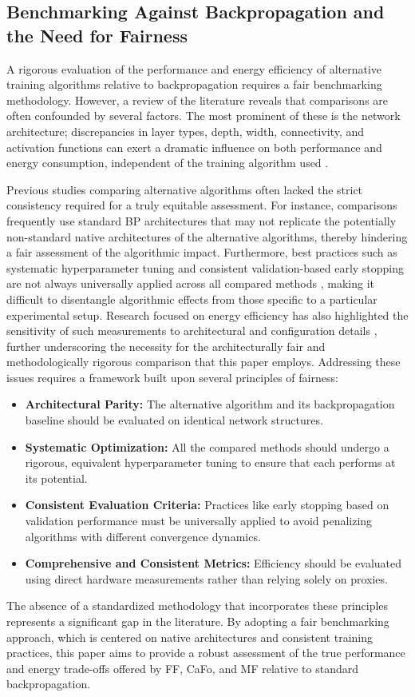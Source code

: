 \subsection{Benchmarking Against Backpropagation and the Need for Fairness}
\label{sec:fair_benchmarking_chap2}
A rigorous evaluation of the performance and energy efficiency of alternative training algorithms relative to backpropagation requires a fair benchmarking methodology. However, a review of the literature reveals that comparisons are often confounded by several factors. The most prominent of these is the network architecture; discrepancies in layer types, depth, width, connectivity, and activation functions can exert a dramatic influence on both performance and energy consumption, independent of the training algorithm used \cite{desislavov2024energy, yarally2023uncovering}.

Previous studies comparing alternative algorithms often lacked the strict consistency required for a truly equitable assessment. For instance, comparisons frequently use standard BP architectures that may not replicate the potentially non-standard native architectures of the alternative algorithms, thereby hindering a fair assessment of the algorithmic impact. Furthermore, best practices such as systematic hyperparameter tuning and consistent validation-based early stopping are not always universally applied across all compared methods \cite{hinton2022forward}, making it difficult to disentangle algorithmic effects from those specific to a particular experimental setup. Research focused on energy efficiency has also highlighted the sensitivity of such measurements to architectural and configuration details \cite{garcia2019estimation}, further underscoring the necessity for the architecturally fair and methodologically rigorous comparison that this paper employs.
Addressing these issues requires a framework built upon several principles of fairness:
\begin{itemize}
\item \textbf{Architectural Parity:} The alternative algorithm and its backpropagation baseline should be evaluated on identical network structures.
\item \textbf{Systematic Optimization:} All the compared methods should undergo a rigorous, equivalent hyperparameter tuning to ensure that each performs at its potential.
\item \textbf{Consistent Evaluation Criteria:} Practices like early stopping based on validation performance must be universally applied to avoid penalizing algorithms with different convergence dynamics.
\item \textbf{Comprehensive and Consistent Metrics:} Efficiency should be evaluated using direct hardware measurements rather than relying solely on proxies.
\end{itemize}
The absence of a standardized methodology that incorporates these principles represents a significant gap in the literature. By adopting a fair benchmarking approach, which is centered on native architectures and consistent training practices, this paper aims to provide a robust assessment of the true performance and energy trade-offs offered by FF, CaFo, and MF relative to standard backpropagation.

